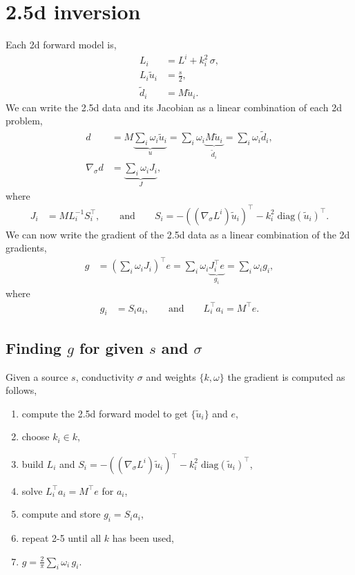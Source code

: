 \documentclass[a4paper,12pt]{article}
\begin{document}
\section*{2.5d inversion}
Each 2d forward model is,
\begin{align*}
L_{i} &= L^{i} + k_i^2\,\sigma, \\
L_{i} \tilde{u}_{i} &= \frac{s}{2}, \\
\tilde{d}_{i} &= M\tilde{u}_{i}.
\end{align*}
We can write the 2.5d data and its Jacobian as a linear combination of each 2d problem,
\begin{align*}
d &= M\underbrace{\sum_i \omega_i \tilde{u}_i}_{u} = \sum_i \omega_i \underbrace{M\tilde{u}_i}_{\tilde{d}_i} = \sum_i \omega_i \tilde{d}_i, \\
\nabla_\sigma d &= \underbrace{\sum_i \omega_i J_i}_{J},
\end{align*}
where
\begin{align*}
J_i &= ML_i^{-1}S_i^{\top}, \hspace{2em}\text{and}\hspace{2em}
S_i = -\left( (\nabla_\sigma L^i)\tilde{u}_i \right)^{\top} - k_i^2 \; \mbox{diag}(\tilde{u}_i)^{\top}.
\end{align*}
We can now write the gradient of the 2.5d data as a linear combination of the 2d gradients,
\begin{align*}
g &= \left( \sum_i \omega_i J_i \right)^\top e = \sum_i \omega_i \underbrace{J_i^\top e}_{g_i} = 
\sum_i \omega_i g_i, 
\end{align*}
where
\begin{align*}
g_i &= S_i a_i, \hspace{2em}\text{and}\hspace{2em}
L_i^{\top}a_i = M^\top e.
\end{align*}
\subsection*{Finding $g$ for given $s$ and $\sigma$}
Given a source $s$, conductivity $\sigma$ and weights $\{k,\omega\}$ the gradient is computed as follows,
\begin{enumerate}
\item compute the 2.5d forward model to get $\{\tilde{u}_{i}\}$ and $e$,
\item choose $k_i\in k$,
\item build $L_{i}$ and $S_{i} = -\left( (\nabla_\sigma L^i)\tilde{u}_{i} \right)^{\top} - k_i^2\; \mbox{diag}(\tilde{u}_{i})^{\top}$,
\item solve $L_{i}^{\top}a_{i} = M^\top e$ for $a_{i}$,
\item compute and store $g_{i} = S_{i} a_{i}$,
\item repeat 2-5 until all $k$ has been used,
\item $g=\frac{2}{\pi}\sum_i \omega_i \,g_{i}$.
\end{enumerate}
%
\end{document}

